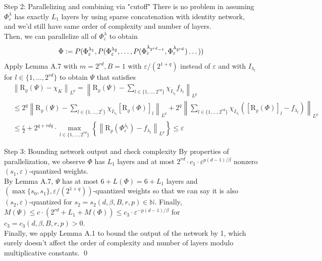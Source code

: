 \documentclass{if-beamer}
\newcommand{\defeq}{\vcentcolon=}
\newcommand{\norm}[2]{\left\lVert#1\right\rVert_{#2}}
\begin{document}
\begin{frame}{Step 2: Parallelizing and combining via "cutoff"}
    There is no problem in assuming $\Phi_{\varepsilon}^{\lambda}$ has exactly $L_1$ layers by using sparse concatenation with identity network, and we'd still have same order of complexity and number of layers.\\
    Then, we can parallelize all of $\Phi_{\varepsilon}^{\lambda}$ to obtain 
    $$\Phi \defeq P(\Phi_{\varepsilon}^{\lambda_1}, P(\Phi_{\varepsilon}^{\lambda_2}, \dots, P(\Phi_{\varepsilon}^{\lambda_{2^{rd}-1}},\Phi_{\varepsilon}^{\lambda_{2^{rd}}})\dots))$$
    Apply Lemma A.7 with $m=2^{rd}, B=1$ with $\varepsilon/(2^{1+q})$ instead of $\varepsilon$ and with $I_{\lambda_l}$ for $l \in \{1,\dots,2^{rd}\}$ to obtain $\Psi$ that satisfies
    {\footnotesize
    \begin{align*}
        &\norm{\mathrm{R}_{\varrho}(\Psi) - \chi_{K}}{L^p} = \norm{\mathrm{R}_{\varrho}(\Psi) - \sum_{l \in \{1,\dots,2^{rd} \}}\chi_{I_{\lambda_l}} f_{\lambda_l}}{L^p}\\
        &\leq 2^q \norm{\mathrm{R}_{\varrho}(\Psi) - \sum_{l \in \{1,\dots,2^r \}}\chi_{I_{\lambda_l}} \left[\mathrm{R}_{\varrho}(\Phi)\right]_l}{L^p} + 2^q \norm{\sum_{l \in \{1,\dots,2^{rd} \}}\chi_{I_{\lambda_l}}\left( \left[\mathrm{R}_{\varrho}(\Phi)\right]_l - f_{\lambda_l} \right)}{L^p}\\
        &\leq \frac{\varepsilon}{2} + 2^{q+rdq}\cdot \max_{l\in\{1,\dots,2^{rd}\}}\left\{ \norm{\mathrm{R}_{\varrho}(\Phi_{\varepsilon}^{\lambda_l}) - f_{\lambda_l}}{L^p} \right\} \leq \varepsilon
    \end{align*}
    }%
\end{frame}

\begin{frame}{Step 3: Bounding network output and check complexity}
    By properties of parallelization, we observe $\Phi$ has $L_1$ layers and at most $2^{rd}\cdot c_1 \cdot \varepsilon^{p(d-1)/\beta}$ nonzero $(s_1,\varepsilon)$-quantized weights.\\
    By Lemma A.7, $\Psi$ has at most $6 + L(\Phi) = 6 + L_1$ layers and \\
    $(\max\{s_0, s_1\}, \varepsilon/(2^{1+q}))$-quantized weights so that we can say it is also $(s_2, \varepsilon)$-quantized for $s_2 = s_2(d,\beta,B,r,p)\in \mathbb{N}$. Finally, $M(\Psi) \leq c \cdot (2^{rd} + L_1 + M(\Phi)) \leq c_3 \cdot \varepsilon^{-p(d-1)/\beta}$ for $c_3=c_3(d,\beta,B,r,p)>0$.\\
    Finally, we apply Lemma A.1 to bound the output of the network by 1, which surely doesn't affect the order of complexity and number of layers modulo multiplicative constants. \qed
\end{frame}
\end{document}
